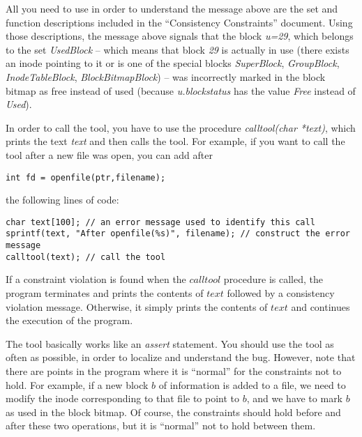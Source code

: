 \documentclass{article}
\begin{document}
\begin{flushleft}
All you need to use in order to understand the message above are the 
set and function descriptions included in the ``Consistency Constraints'' 
document. 
Using those descriptions, the message above signals that the block {\it u=29}, 
which belongs to the set {\it UsedBlock} -- 
which means that block {\it 29} is actually in use (there exists an inode 
pointing to it or is one of the special blocks {\it SuperBlock}, 
{\it GroupBlock}, {\it InodeTableBlock}, {\it BlockBitmapBlock}) 
-- was incorrectly marked in the block bitmap as free instead of used 
(because {\it u.blockstatus} has the value {\it Free} instead of {\it Used}).


\vspace{0.1in}
In order to call the tool, you have to use the procedure 
{\it calltool(char *text)}, which prints the text {\it text} and then 
calls the tool.   For example, if you want to call the tool after a new file
was open, you can add after
\begin{verbatim}
int fd = openfile(ptr,filename);
\end{verbatim}

the following lines of code:
\begin{verbatim}
char text[100]; // an error message used to identify this call
sprintf(text, "After openfile(%s)", filename); // construct the error message
calltool(text); // call the tool
\end{verbatim}

If a constraint violation is found when the $calltool$ procedure
is called, the program terminates and prints the contents of $text$ 
followed by a consistency violation message.
Otherwise, it simply prints the contents of $text$ and continues the execution 
of the program.

\vspace{0.1in}
The tool basically works like an {\it assert} statement. 
You should use the tool as often as possible, in order to localize and 
understand the bug.  However, note that there are points in the program
where it is ``normal'' for the constraints not to hold.  For example, 
if a new block $b$ of information is added to a file, we need to modify the 
inode corresponding to that file to point to $b$, and we have to mark $b$ as
used in the block bitmap. Of course, the constraints should hold before and
after these two operations, but it is ``normal'' not to hold  between them.

\end{flushleft}
\end{document}
